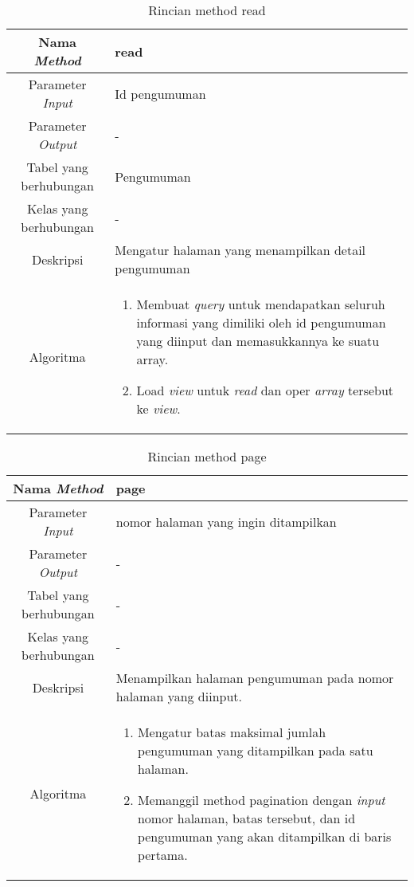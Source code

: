 \begin{center}
	\begin{table}[H]
	\caption{Rincian method read}
	\label{table:pengumuman-read}
\begin{tabular}{|c|p{11cm}|}
\hline
Nama \textit{Method} 	& 	 read	\\
\hline
Parameter \textit{Input} & Id pengumuman \\
\hline
Parameter \textit{Output} & - \\
\hline
Tabel yang berhubungan & Pengumuman \\
\hline
Kelas yang berhubungan & - \\
\hline
Deskripsi	& Mengatur halaman yang menampilkan detail pengumuman\\
\hline
Algoritma	& \begin{enumerate}
				\item Membuat \textit{query} untuk mendapatkan seluruh informasi yang dimiliki oleh id pengumuman yang diinput dan memasukkannya ke suatu array.
				\item Load \textit{view} untuk \textit{read} dan oper \textit{array} tersebut ke \textit{view}.
				\end{enumerate} \\
\hline
\end{tabular}
\end{table}
\end{center}

\begin{center}
	\begin{table}[H]
	\caption{Rincian method page}
	\label{table:pengumuman-page}
\begin{tabular}{|c|p{11cm}|}
\hline
Nama \textit{Method} 	& 	 page	\\
\hline
Parameter \textit{Input} & nomor halaman yang ingin ditampilkan \\
\hline
Parameter \textit{Output} & - \\
\hline
Tabel yang berhubungan & -\\
\hline
Kelas yang berhubungan & - \\
\hline
Deskripsi	& Menampilkan halaman pengumuman pada nomor halaman yang diinput.\\
\hline
Algoritma	& \begin{enumerate}
				\item Mengatur batas maksimal jumlah pengumuman yang ditampilkan pada satu halaman.
				\item Memanggil method pagination dengan \textit{input} nomor halaman, batas tersebut, dan id pengumuman yang akan ditampilkan di baris pertama.
				\end{enumerate} \\
\hline
\end{tabular}
\end{table}
\end{center}

